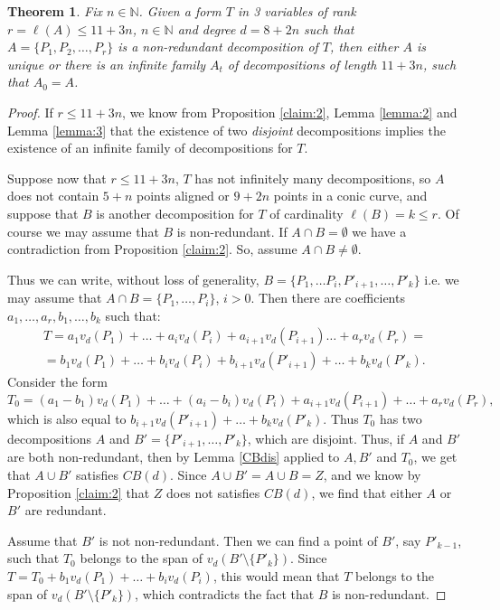 \documentclass[a4paper,10pt,oneside]{article}
\theoremstyle{casep}
\newcommand{\N}{\mathbb{N}}
\newtheorem{theorem}{Theorem}[section]
\theoremstyle{definition}
\begin{document}
\begin{theorem}
\label{proposition:TM}
Fix $ n \in \N $. Given a form $T$ in 3 variables of rank $r= \ell(A) \leq 11+3n$, $ n \in \N $ and degree $ d=8+2n $ such that $A= \{P_1,P_2, \dots ,P_r \}$ is a non-redundant decomposition of $T$, then either $A$ is unique or there is an infinite family $A_t$ of decompositions of length $11+3n$, such that $A_0=A$.
\end{theorem}
\begin{proof} If $r \leq 11+ 3n$, we know from Proposition \ref{claim:2}, Lemma \ref{lemma:2} and Lemma \ref{lemma:3} that the existence of two \emph{disjoint} decompositions implies the existence of an infinite family of decompositions for $ T $.

Suppose now that $r \leq 11+ 3n$, $T$ has not infinitely many decompositions, so $ A $ does not contain $5+n$ points aligned or $9+2n$ points in a conic curve, and suppose that $B$ is another decomposition for $T$ of cardinality $\ell(B)=k \leq r$. 
Of course we may assume that $B$ is non-redundant.
If $A \cap B= \emptyset$ we have a contradiction from Proposition \ref{claim:2}. So, assume $A\cap B \neq \emptyset$. 

Thus we can write, without loss of generality, $B=\{ P_1,\dots P_i,P'_{i+1},\dots,P'_k\}$ i.e.
we may assume that $A\cap B=\{ P_1,\dots, P_i\}$, $i>0$.
Then there are coefficients $a_1,\dots,a_{r},b_1,\dots,b_k$ such that:
\begin{multline*}T=a_1v_d( P_1)+\dots+a_iv_d(P_i)+a_{i+1}v_d(P_{i+1})\dots+a_{r} v_d(P_{r}) = \\
=b_1 v_d(P_1)+\dots+b_i v_d(P_i)+ b_{i+1}v_d(P'_{i+1})+\dots+b_k v_d(P'_k).\end{multline*}
Consider the form 
$$T_0 = (a_1-b_1)v_d( P_1)+\dots+(a_i-b_i)v_d( P_i)+a_{i+1}v_d(P_{i+1})+\dots+a_r v_d(P_{r}),$$
which is also equal to $ b_{i+1}v_d(P'_{i+1})+\dots+b_k v_d(P'_k)$. Thus $T_0$ has two decompositions $A$ and
$B'=\{P'_{i+1},\dots,P'_k\}$, which are disjoint. Thus, if $A$ and $B'$ are both non-redundant, then by Lemma \ref{CBdis} 
applied to $A,B'$ and $T_0$, we get that $A\cup B'$ satisfies $CB(d)$.
Since $A\cup B'=A\cup B=Z$, and we know by Proposition \ref{claim:2} that $Z$ does not satisfies $CB(d)$,
we find that either $A$ or $B'$ are redundant. 

Assume that $B'$ is not non-redundant. Then we can find a point of $B'$, say $P'_{k-1}$, such that
$T_0$ belongs to the span of $v_d(B'\setminus\{P'_k\})$. Since $T=T_0+b_1v_d(P_1)+\dots+b_iv_d(P_i)$,
this would mean that $T$ belongs to the span of $v_d(B'\setminus\{P'_k\})$, which contradicts the fact that $B$ is non-redundant.


\end{proof}
\end{document}
